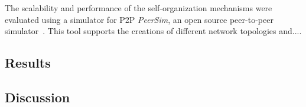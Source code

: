 The scalability and performance of the self-organization mechanisms were evaluated using a simulator for P2P  \textit{PeerSim}, an open source peer-to-peer simulator~\cite{p2p09-peersim}. This tool supports the creations of different network topologies and.... 

%
%

\subsection{Results}

\subsection{Discussion}